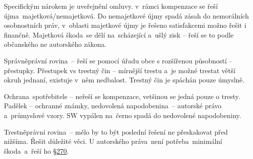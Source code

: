 Specifickým nárokem je uveřejnění omluvy. v~rámci kompenzace se řeší újma~majetková/nemajetková. Do nemajetkové újmy spadá zásah do nemorálních osobnostních práv, v~oblasti majetkové újmy je řešeno satisfakcemi možno řešit i finančně. Majetková škoda~se dělí na~scházející a~ušlý zisk -- řeší se to podle občanského ne autorského zákona.

Správněprávní rovina~-- řeší se pomocí úřadu obce s rozšířenou působností -- přestupky. Přestupek vs trestný čin -- mírnější trestu a~je možné trestat větší okruh jednaní, existuje v~něm nedbalost. Trestný čin je spáchán pouze úmyslně. 

Ochrana~spotřebitele -- neřeší se kompenzace, vetšinou se jedná pouze o tresty. Padělek -- ochranné známky, nedovolená napodobenina~-- autorské právo a~průmyslové vzory. SW vypálen na~černo spadá do nedovolené napodobeniny.

Trestněprávní rovina~-- mělo by to být poslední řešení ne přeskakovat před nižšíma. Řešit důležité věci. U autorského práva~není potřeba~minimální škoda~a~řeší ho \href{https://www.zakonyprolidi.cz/cs/2009-40#p270}{§270}. 


